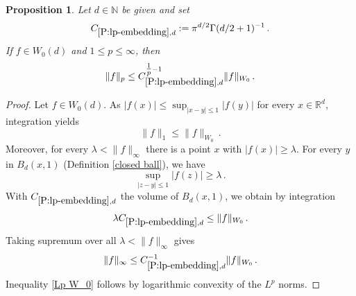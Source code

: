 \documentclass[12pt,reqno]{amsart}
\theoremstyle{plain}
\newtheorem{proposition}[theorem]{Proposition}
\numberwithin{equation}{section}
\theoremstyle{remark}
\newcommand{\R}{{\mathbb R}}
\newcommand{\N}{{\mathbb N}}
\begin{document}
\begin{proposition}\label{P:lp-embedding}
Let $d\in \N$ be given and set
\begin{equation}\label{auto:Wiener-Lp-embedding-constant}
    C_{\ref{P:lp-embedding},d}:=\pi^{d/2}\Gamma(d/2+1)^{-1}\, .
\end{equation}
If $f\in W_0(d)$ and $1\le p\le \infty$, then
\begin{equation}\label{Lp W_0}
\|f\|_p\le C_{\ref{P:lp-embedding},d}^{\tfrac 1p -1}\|f\|_{W_0}    \, .
\end{equation}
\end{proposition}

\begin{proof}
Let $f\in W_0(d)$. As $|f(x)|\le \sup_{|x-y|\le 1}|f(y)|$ for every $x\in \R^d$, integration yields
\begin{equation}
    \|f\|_1\le \|f\|_{W_0}\, .
\end{equation}
Moreover, for every $\lambda<\|f\|_\infty$  there is a point $x$ with $|f(x)|\ge \lambda$.
For every $y$ in  $B_d(x,1)$ (Definition \ref{closed ball}), we have
\begin{equation*}
    \sup_{|z-y|\le 1}
|f(z)|\ge \lambda \, .\end{equation*}
With $C_{\ref{P:lp-embedding},d}$  the volume of  $B_d(x,1)$, we obtain by integration
\begin{equation}
    \lambda C_{\ref{P:lp-embedding},d}\le \|f\|_{W_0}\, .
\end{equation}
Taking supremum over all $\lambda<
\|f\|_\infty$ gives
\begin{equation}
    \|f\|_\infty\le C_{\ref{P:lp-embedding},d}^{-1}\|f\|_{W_0}\, .
\end{equation}
Inequality \eqref{Lp W_0} follows by logarithmic convexity of the $L^p$ norms.
\end{proof}
\end{document}

